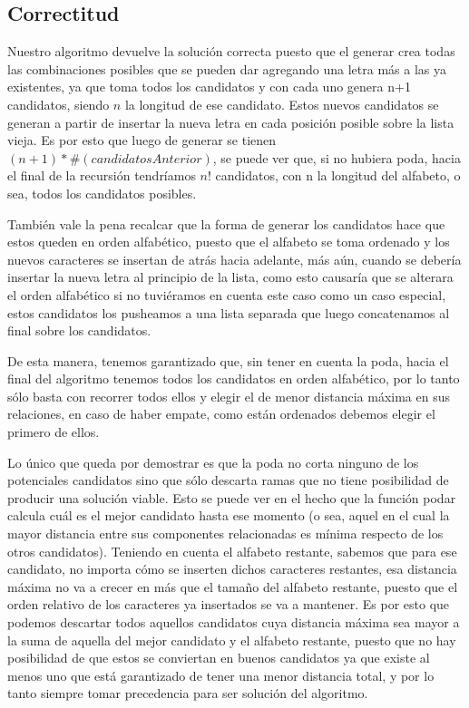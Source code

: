 \documentclass[a4paper, 10pt]{article}
\begin{document}
\subsection{Correctitud}

Nuestro algoritmo devuelve la solución correcta puesto que el generar crea todas las combinaciones posibles que se pueden dar agregando una letra más a las ya existentes, ya que toma todos los candidatos y con cada uno genera n+1 candidatos, siendo $n$ la longitud de ese candidato. Estos nuevos candidatos se generan a partir de insertar la nueva letra en cada posición posible sobre la lista vieja. Es por esto que luego de generar se tienen $(n+1)*\#(candidatosAnterior)$, se puede ver que, si no hubiera poda, hacia el final de la recursión tendríamos $n!$ candidatos, con n la longitud del alfabeto, o sea, todos los candidatos posibles.

También vale la pena recalcar que la forma de generar los candidatos hace que estos queden en orden alfabético, puesto que el alfabeto se toma ordenado y los nuevos caracteres se insertan de atrás hacia adelante, más aún, cuando se debería insertar la nueva letra al principio de la lista, como esto causaría que se alterara el orden alfabético si no tuviéramos en cuenta este caso como un caso especial, estos candidatos los pusheamos a una lista separada que luego concatenamos al final sobre los candidatos. 

De esta manera, tenemos garantizado que, sin tener en cuenta la poda, hacia el final del algoritmo tenemos todos los
candidatos en orden alfabético, por lo tanto sólo basta con recorrer todos ellos y elegir el de menor distancia máxima en sus
relaciones, en caso de haber empate, como están ordenados debemos elegir el primero de ellos.

Lo único que queda por demostrar es que la poda no corta ninguno de los potenciales candidatos sino que sólo descarta ramas que no tiene posibilidad de producir una solución viable. Esto se puede ver en el hecho que la función podar calcula cuál es el mejor candidato hasta ese momento (o sea, aquel en el cual la mayor distancia entre sus componentes relacionadas es mínima respecto de los otros candidatos). Teniendo en cuenta el alfabeto restante, sabemos que para ese candidato, no importa cómo se inserten dichos caracteres restantes, esa distancia máxima no va a crecer en más que el tamaño del alfabeto restante, puesto que el orden relativo de los caracteres ya insertados se va a mantener. Es por esto que podemos descartar todos aquellos candidatos cuya distancia máxima sea mayor a la suma de aquella del mejor candidato y el alfabeto restante, puesto que no hay posibilidad de que estos se conviertan en buenos candidatos ya que existe al menos uno que está garantizado de tener una menor distancia total, y por lo tanto siempre tomar precedencia para ser solución del algoritmo.
\end{document}
